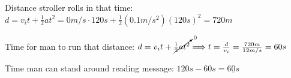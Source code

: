\documentclass[letterpaper, 12pt]{article}
\begin{document}
\begin{enumerate}
	Distance stroller rolls in that time: $ d = v_i t + \frac{1}{2}at^2 = 0m/s \cdot 120s + \frac{1}{2}(0.1m/s^2)(120s)^2 = 720 m   $

	\vspace{0.1in}	
	Time for man to run that distance: $ d = v_i t + \cancelto{0}{\frac{1}{2}at^2} \Longrightarrow  t = \frac{d}{v_i} = \frac{720m}{12 m/s} = 60s  $
	
	\vspace{0.1in}
	Time man can stand around reading message: $120s - 60s = \underline{60s} $
	







	
\end{enumerate}
 
\end{document}
